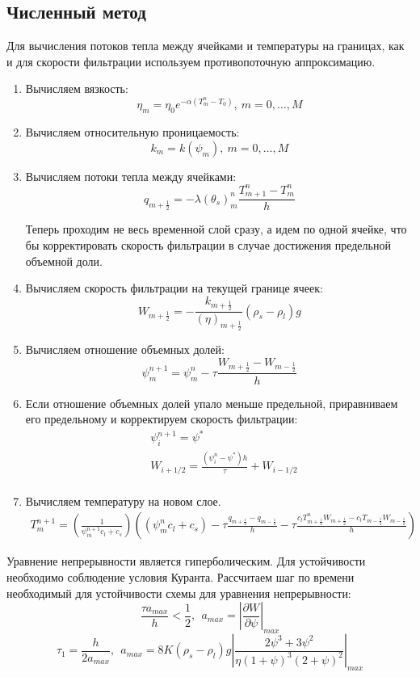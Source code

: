 \documentclass[12pt,a4paper]{article}
\newcommand{\pd}[2]{\frac{\partial #1}{\partial #2}}
\begin{document}
\subsection{Численный метод}
Для вычисления потоков тепла между ячейками и температуры на границах, как и для скорости фильтрации используем противопоточную аппроксимацию.
\begin{enumerate}
\item Вычисляем вязкость:
$$
\eta_m = \eta_0 e^{-\alpha(T_m^n - T_{0})},\ m = 0, \dots ,M
$$
\item Вычисляем относительную проницаемость:
$$
k_m = k(\psi_m) , \ m = 0,  \dots ,M
$$
\item Вычисляем потоки тепла между ячейками:
$$
q_{m+\frac12} = - \lambda (\theta_{s})_m^{n} \frac{T_{m+1}^n - T_m^n}{h} 
$$

Теперь проходим не весь временной слой сразу, а идем по одной ячейке, что бы корректировать скорость фильтрации в случае достижения предельной объемной доли.
\item Вычисляем скорость фильтрации на текущей границе ячеек:
$$
W_{m+\frac12} = -\frac{k_{m+\frac12}}{(\eta)_{m+\frac12}}(\rho_s - \rho_l)g
$$
\item  Вычисляем отношение объемных долей:
$$
\psi_m^{n+1} = \psi_m^n - \tau \frac{W_{m+\frac12} - W_{m-\frac12}}{h}
$$
\item Если отношение объемных долей упало меньше предельной, приравниваем его предельному и корректируем скорость фильтрации:
$$
\begin{aligned}
&\psi_{i}^{n+1} = \psi^* \\
&W_{i+1/2} = \frac{(\psi_i^n - \psi^*)h}{\tau} + W_{i-1/2} \\
\end{aligned}
$$
\item Вычисляем температуру на новом слое. 
\begin{multline}
 T_m^{n+1} =  \left(\frac{1}{\psi_m^{n+1} c_l + c_s}\right)\left( (\psi_m^n  c_l + c_s)
- \tau\frac{q_{m+\frac12} - q_{m-\frac12}}{h} - \tau\frac{c_l T_{m+\frac12}^n W_{m+\frac12} - c_l T_{m-\frac12} W_{m-\frac12}}{h}\right)
\end{multline}
\end{enumerate}

Уравнение непрерывности является гиперболическим. Для устойчивости необходимо соблюдение условия Куранта. Рассчитаем шаг по времени необходимый для устойчивости схемы для уравнения непрерывности:
$$
\frac{\tau a_{max}}{h} < \frac12 ,\ \ a_{max} = \left|\pd{W}{\psi}\right|_{max}
$$
$$
\tau_1 = \frac{h}{2 a_{max}},\ \  a_{max} = 8 K (\rho_s - \rho_l)g\left|\frac{2\psi^3 + 3\psi^2}{\eta(1 + \psi)^3(2+\psi)^2}\right|_{max}
$$
\end{document}

